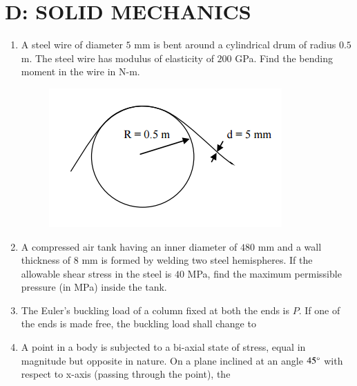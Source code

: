 \documentclass[a4paper,10pt]{article}
\begin{document}
\section*{D: SOLID MECHANICS}
\begin{enumerate}
    \item A steel wire of diameter $5$ mm is bent around a cylindrical drum of radius $0.5$ m. The steel wire has modulus of elasticity of $200$ GPa. Find the bending moment in the wire in N-m.
    \begin{figure}[H] \centering \includegraphics[width=0.4\columnwidth]{q1_solid.png} \caption*{} \label{fig:q1_solid} \end{figure}
    
    \hfill{}

    \item A compressed air tank having an inner diameter of $480$ mm and a wall thickness of $8$ mm is formed by welding two steel hemispheres. If the allowable shear stress in the steel is $40$ MPa, find the maximum permissible pressure (in MPa) inside the tank.
    
    \hfill{}

    \item The Euler's buckling load of a column fixed at both the ends is $P$. If one of the ends is made free, the buckling load shall change to
    
    \hfill{}
    \begin{enumerate}[label=\Alph*)]
    \end{enumerate}

    \item A point in a body is subjected to a bi-axial state of stress, equal in magnitude but opposite in nature. On a plane inclined at an angle $45\degree$ with respect to x-axis (passing through the point), the
    

\end{enumerate}
\end{document}
